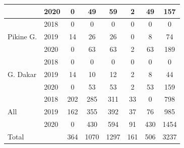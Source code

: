 \begin{tabular}{llcccccc}
& 2020      &           0&          49&          59&           2&          49&         157\\
\hline \multirow{3}{*}{Pikine G.} & 2018&           0&           0&           0&           0&           0&           0\\
& 2019      &          14&          26&          26&           0&           8&          74\\
& 2020      &           0&          63&          63&           2&          63&         189\\
\hline \multirow{3}{*}{G. Dakar} & 2018&           0&           0&           0&           0&           0&           0\\
& 2019      &          14&          10&          12&           2&           8&          44\\
& 2020      &           0&          53&          53&           2&          53&         159\\
\hline \multirow{3}{*}{All} & 2018&         202&         285&         311&          33&           0&         798\\
& 2019      &         162&         355&         392&          37&          76&         985\\
& 2020      &           0&         430&         594&          91&         430&        1454\\
\hline Total &&         364&        1070&        1297&         161&         506&        3237\\
\hline \end{tabular}
